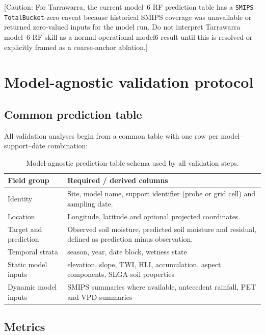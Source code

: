 \documentclass[11pt,a4paper]{article}
\newcommand{\modelSix}{model~6 RF}
\newcommand{\smips}{\texttt{SMIPS TotalBucket}}
\newcommand{\caution}[1]{\textcolor{cautioncolor}{[Caution: #1]}}
\begin{document}
\caution{For Tarrawarra, the current \modelSix{} prediction table has a
\smips{}-zero caveat because historical SMIPS coverage was unavailable or
returned zero-valued inputs for the model run.  Do not interpret Tarrawarra
\modelSix{} skill as a normal operational model6 result until this is resolved
or explicitly framed as a coarse-anchor ablation.}

\section{Model-agnostic validation protocol}\label{sec:protocol}

\subsection{Common prediction table}\label{sec:table-schema}

All validation analyses begin from a common table with one row per
model--support--date combination:

\begin{table}[htbp]
\centering
\small
\caption{Model-agnostic prediction-table schema used by all validation steps.}
\label{tab:prediction-schema}
\begin{tabularx}{\textwidth}{>{\raggedright\arraybackslash}p{3.2cm}
                              >{\raggedright\arraybackslash}X}
\toprule
Field group & Required / derived columns \\
\midrule
Identity & Site, model name, support identifier (probe or grid cell) and
sampling date. \\
Location & Longitude, latitude and optional projected coordinates. \\
Target and prediction & Observed soil moisture, predicted soil moisture and
residual, defined as prediction minus observation. \\
Temporal strata & season, year, date block, wetness state \\
Static model inputs & elevation, slope, TWI, HLI, accumulation, aspect
components, SLGA soil properties \\
Dynamic model inputs & SMIPS summaries where available, antecedent rainfall,
PET and VPD summaries \\
\bottomrule
\end{tabularx}
\end{table}

\subsection{Metrics}\label{sec:metrics}
\end{document}
